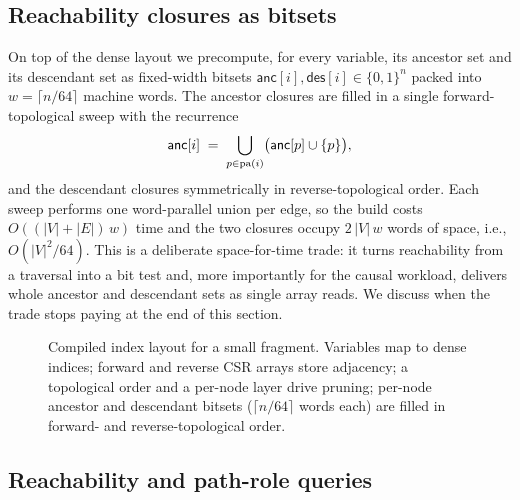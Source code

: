 \subsection{Reachability closures as bitsets}\label{sec:index:bitsets}

On top of the dense layout we precompute, for every variable, its ancestor set
and its descendant set as fixed-width bitsets
$\textsf{anc}[i], \textsf{des}[i] \in \{0,1\}^n$ packed into
$w = \lceil n/64 \rceil$ machine words. The ancestor closures are filled in a
single forward-topological sweep with the recurrence
\[
  \textsf{anc}[i] \;=\; \bigcup_{p \in \mathrm{pa}(i)} \bigl(\textsf{anc}[p] \cup \{p\}\bigr),
\]
and the descendant closures symmetrically in reverse-topological order. Each
sweep performs one word-parallel union per edge, so the build costs
$O((|V|+|E|)\, w)$ time and the two closures occupy $2\,|V|\,w$ words of
space, i.e., $O(|V|^2/64)$. This is a deliberate space-for-time trade: it
turns reachability from a traversal into a bit test and, more importantly for
the causal workload, delivers whole ancestor and descendant sets as single
array reads. We discuss when the trade stops paying at the end of this
section.

\begin{figure}[t]\centering
  \resizebox{\linewidth}{!}{}
  \caption{Compiled index layout for a small fragment. Variables map to dense
  indices; forward and reverse CSR arrays store adjacency; a topological order
  and a per-node layer drive pruning; per-node ancestor and descendant bitsets
  ($\lceil n/64\rceil$ words each) are filled in forward- and
  reverse-topological order.}
  \label{fig:index}
\end{figure}

\subsection{Reachability and path-role queries}\label{sec:index:reach}

